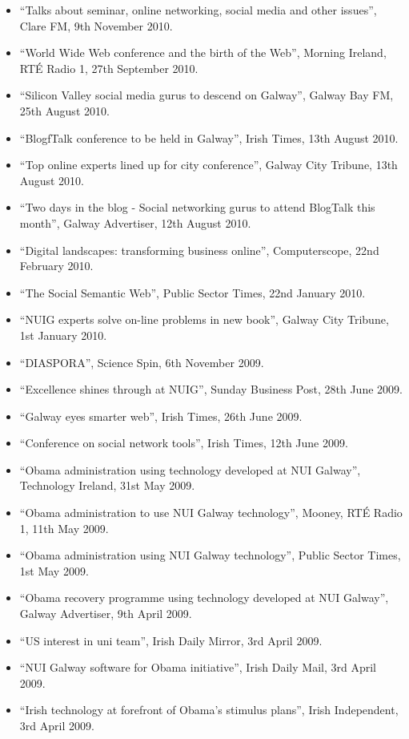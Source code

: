 \documentclass[10pt,a4paper]{res} %
\begin{document}
\begin{resume}
{\begin{itemize}
\item ``Talks about seminar, online networking, social media and other issues'', Clare FM, 9th November 2010.
\item ``World Wide Web conference and the birth of the Web'', Morning Ireland, RT\'{E} Radio 1, 27th September 2010.
\item ``Silicon Valley social media gurus to descend on Galway'', Galway Bay FM, 25th August 2010.
\item ``BlogfTalk conference to be held in Galway'', Irish Times, 13th August 2010.
\item ``Top online experts lined up for city conference'', Galway City Tribune, 13th August 2010.
\item ``Two days in the blog - Social networking gurus to attend BlogTalk this month'', Galway Advertiser, 12th August 2010.
\item ``Digital landscapes: transforming business online'', Computerscope, 22nd February 2010.
\item ``The Social Semantic Web'', Public Sector Times, 22nd January 2010.
\item ``NUIG experts solve on-line problems in new book'', Galway City Tribune, 1st January 2010.
\item ``DIASPORA'', Science Spin, 6th November 2009.
\item ``Excellence shines through at NUIG'', Sunday Business Post, 28th June 2009.
\item ``Galway eyes smarter web'', Irish Times, 26th June 2009.
\item ``Conference on social network tools'', Irish Times, 12th June 2009.
\item ``Obama administration using technology developed at NUI Galway'', Technology Ireland, 31st May 2009.
\item ``Obama administration to use NUI Galway technology'', Mooney, RT\'{E} Radio 1, 11th May 2009.
\item ``Obama administration using NUI Galway technology'', Public Sector Times, 1st May 2009.
\item ``Obama recovery programme using technology developed at NUI Galway'', Galway Advertiser, 9th April 2009.
\item ``US interest in uni team'', Irish Daily Mirror, 3rd April 2009.
\item ``NUI Galway software for Obama initiative'', Irish Daily Mail, 3rd April 2009.
\item ``Irish technology at forefront of Obama's stimulus plans'', Irish Independent, 3rd April 2009.

\end{itemize}}
\end{resume}
\end{document}
